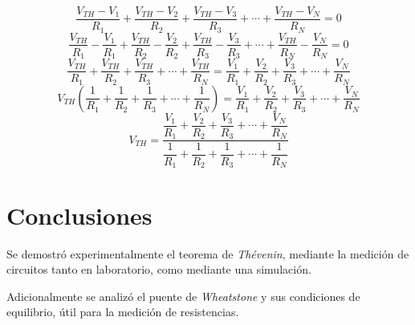 \documentclass[letter,11pt]{article}
\begin{document}
\begin{enumerate}
\begin{equation*}
    \frac{V_{TH} - V_1}{R_1} + \frac{V_{TH} - V_2}{R_2} +
    \frac{V_{TH} - V_3}{R_3} + \cdots + \frac{V_{TH} - V_N}{R_N} = 0
\end{equation*}
\begin{equation*}
    \frac{V_{TH}}{R_1} - \frac{V_1}{R_1} +
    \frac{V_{TH}}{R_2} - \frac{V_2}{R_2} +
    \frac{V_{TH}}{R_3} - \frac{V_3}{R_3} + \cdots +
    \frac{V_{TH}}{R_N} - \frac{V_N}{R_N} = 0
\end{equation*}
\begin{equation*}
    \frac{V_{TH}}{R_1} + \frac{V_{TH}}{R_2} +
    \frac{V_{TH}}{R_3} + \cdots + \frac{V_{TH}}{R_N} =
    \frac{V_1}{R_1} + \frac{V_2}{R_2} +
    \frac{V_3}{R_3} + \cdots + \frac{V_N}{R_N} 
\end{equation*}
\begin{equation*}
    V_{TH}\left(\frac{1}{R_1} + \frac{1}{R_2} +
    \frac{1}{R_3} + \cdots + \frac{1}{R_N}\right) =
    \frac{V_1}{R_1} + \frac{V_2}{R_2} +
    \frac{V_3}{R_3} + \cdots + \frac{V_N}{R_N} 
\end{equation*}
\begin{equation*}
    V_{TH}= \dfrac{\dfrac{V_1}{R_1} + \dfrac{V_2}{R_2} +
    \dfrac{V_3}{R_3} + \cdots + \dfrac{V_N}{R_N}}{\dfrac{1}{R_1} +
    \dfrac{1}{R_2} + \dfrac{1}{R_3} + \cdots + \dfrac{1}{R_N}}
\end{equation*}

\end{enumerate}

\section{Conclusiones}
Se demostró experimentalmente el teorema de \emph{Thévenin}, mediante la
medición de circuitos tanto en laboratorio, como mediante una simulación.

Adicionalmente se analizó el puente de \emph{Wheatstone} y sus condiciones de
equilibrio, útil para la medición de resistencias.
\end{document}
